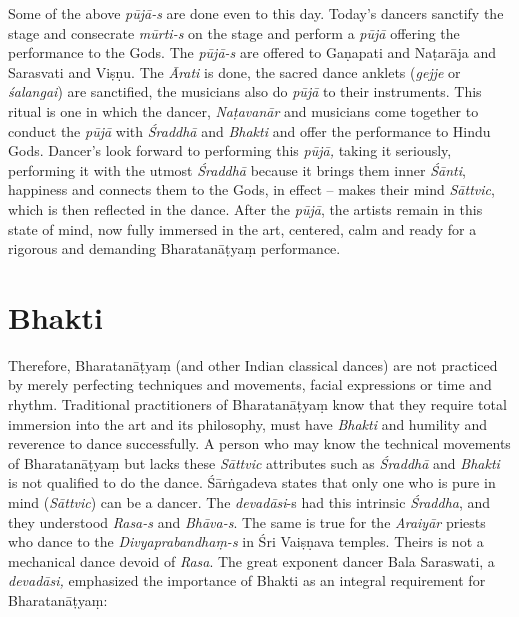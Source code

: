 Some of the above \textit{pūjā-s} are done even to this day. Today’s dancers sanctify the stage and consecrate \textit{mūrti-s} on the stage and perform a \textit{pūjā} offering the performance to the Gods. The \textit{pūjā-s }are offered to Gaṇapati and Naṭarāja and Sarasvati and Viṣṇu. The \textit{Ārati} is done, the sacred dance anklets (\textit{gejje} or \textit{śalangai}) are sanctified, the musicians also do \textit{pūjā }to their instruments. This ritual is one in which the dancer, \textit{Naṭavanār} and musicians come together to conduct the \textit{pūjā }with \textit{Śraddhā} and \textit{Bhakti} and offer the performance to Hindu Gods. Dancer’s look forward to performing this \textit{pūjā,} taking it seriously, performing it with the utmost \textit{Śraddhā} because it brings them inner \textit{Śānti}, happiness and connects them to the Gods, in effect – makes their mind \textit{Sāttvic}, which is then reflected in the dance. After the \textit{pūjā}, the artists remain in this state of mind, now fully immersed in the art, centered, calm and ready for a rigorous and demanding Bharatanāṭyaṃ performance.


\section*{Bhakti}

Therefore, Bharatanāṭyaṃ (and other Indian classical dances) are not practiced by merely perfecting techniques and movements, facial expressions or time and rhythm. Traditional practitioners of Bharatanāṭyaṃ know that they require total immersion into the art and its philosophy, must have \textit{Bhakti} and humility and reverence to dance successfully. A person who may know the technical movements of Bharatanāṭyaṃ but lacks these \textit{Sāttvic} attributes such as \textit{Śraddhā} and \textit{Bhakti} is not qualified to do the dance. Śārṅgadeva states that only one who is pure in mind (\textit{Sāttvic}) can be a dancer. The \textit{devadāsi}-s had this intrinsic \textit{Śraddha}, and they understood \textit{Rasa-s} and\textit{ Bhāva-s}. The same is true for the \textit{Araiyār} priests who dance to the \textit{Divyaprabandhaṃ-s} in Śri Vaiṣṇava temples. Theirs is not a mechanical dance devoid of \textit{Rasa}. The great exponent dancer Bala Saraswati, a \textit{devadāsi,} emphasized the importance of Bhakti as an integral requirement for Bharatanāṭyaṃ:

\vskip 3pt

